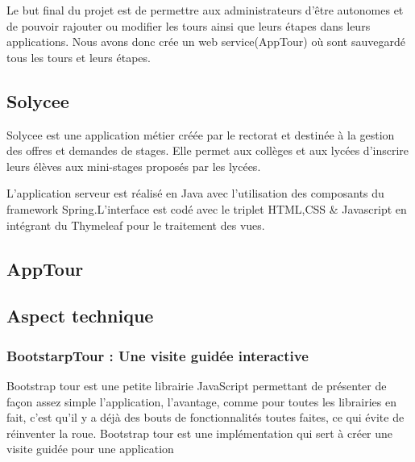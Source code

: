 \documentclass[a4paper]{article}
\begin{document}
Le but final du projet est de permettre aux administrateurs d'être autonomes et de pouvoir rajouter ou modifier les tours ainsi que leurs  étapes dans leurs applications. Nous avons donc crée un web service(AppTour) où sont sauvegardé tous les tours et leurs étapes.

\subsection{Solycee}

Solycee est une application métier créée par le rectorat et destinée à la gestion des offres et demandes de stages. Elle permet aux collèges et aux lycées d'inscrire leurs élèves aux mini-stages proposés par les lycées.  

L'application serveur est réalisé en Java avec l'utilisation des composants du framework Spring.L'interface est codé avec le triplet HTML,CSS \& Javascript en intégrant du Thymeleaf pour le traitement des vues.  

\subsection{AppTour}     

\subsection{Aspect technique}
\subsubsection{BootstarpTour : Une visite guidée interactive}
 
Bootstrap tour est une petite librairie JavaScript permettant de présenter de façon assez simple l’application, l’avantage, comme pour toutes les librairies en fait, c’est qu’il y a déjà des bouts de fonctionnalités toutes faites, ce qui évite de réinventer la roue. Bootstrap tour est une implémentation qui sert à créer une visite guidée pour une application 
\end{document}
